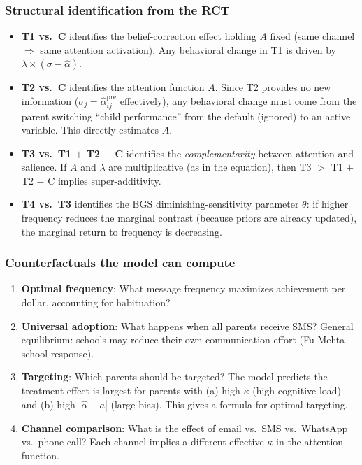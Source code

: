 \documentclass[11pt]{article}
\begin{document}
\subsubsection{Structural identification from the RCT}
\begin{itemize}
  \item \textbf{T1 vs.\ C} identifies the belief-correction effect holding $A$ fixed (same channel $\Rightarrow$ same attention activation). Any behavioral change in T1 is driven by $\lambda \times (\sigma - \hat{\alpha})$.
  \item \textbf{T2 vs.\ C} identifies the attention function $A$. Since T2 provides no new information ($\sigma_j = \hat{\alpha}_{ij}^{\text{pre}}$ effectively), any behavioral change must come from the parent switching ``child performance'' from the default (ignored) to an active variable. This directly estimates $A$.
  \item \textbf{T3 vs.\ T1 $+$ T2 $-$ C} identifies the \emph{complementarity} between attention and salience. If $A$ and $\lambda$ are multiplicative (as in the equation), then T3 $>$ T1 $+$ T2 $-$ C implies super-additivity.
  \item \textbf{T4 vs.\ T3} identifies the BGS diminishing-sensitivity parameter $\theta$: if higher frequency reduces the marginal contrast (because priors are already updated), the marginal return to frequency is decreasing.
\end{itemize}

\subsubsection{Counterfactuals the model can compute}
\begin{enumerate}
  \item \textbf{Optimal frequency}: What message frequency maximizes achievement per dollar, accounting for habituation?
  \item \textbf{Universal adoption}: What happens when all parents receive SMS? General equilibrium: schools may reduce their own communication effort (Fu-Mehta school response).
  \item \textbf{Targeting}: Which parents should be targeted? The model predicts the treatment effect is largest for parents with (a) high $\kappa$ (high cognitive load) and (b) high $|\hat{\alpha} - a|$ (large bias). This gives a formula for optimal targeting.
  \item \textbf{Channel comparison}: What is the effect of email vs.\ SMS vs.\ WhatsApp vs.\ phone call? Each channel implies a different effective $\kappa$ in the attention function.
\end{enumerate}
\end{document}
